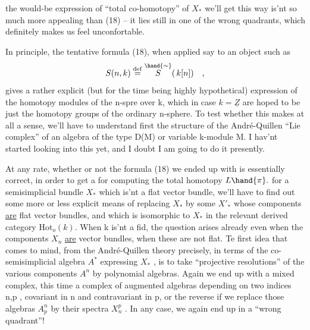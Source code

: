 
the would-be expression of ``total co-homotopy'' of $X_*$ we'll get this
way is'nt so much more appealing than (18) -- it lies still in one of
the wrong quadrants, which definitely makes us feel unconfortable.

In principle, the tentative formula (18), when applied say
to an object such as
\[ S(n,k)\overset{\mathrm{def}}{=} \overset{\hand{\sim}}{S}(\, k[n]) \quad , \]
gives a rather explicit (but for the time being highly hypothetical\hand{!})
expression of the homotopy modules of the n-spre over k, which in
case $k=\underline{Z}$ are hoped to be just the homotopy groups of the ordinary
n-sphere. To test whether this makes at all a sense, we'll have to
understand first the structure of the  André-Quillen ``Lie complex''
of an algebra  of the type D(M)\hand{,} or variable k-module M. I hav'nt started
looking into this yet, and I doubt I am going to do it presently.

At any rate, whether or not the formula (18) we ended up with
is essentially correct, in order  to get a   for computing
the total homotopy $L\hand{\pi}.$ for a semisimplicial bundle $X_*$ which is'nt a
flat vector bundle, we'll have to find out some more or less explicit
means of replacing $X_*$ by some $X'_*$  whose components \uline{are} flat vector
bundles, and which is isomorphic to $X_*$ in the relevant derived category
$\mathrm{Hot}_o(k)$. When k is'nt a fid, the question arises already even when 
 the components $X_n$ \uline{are} vector bundles, when these are not flat. Te
first idea that comes to mind, from the André-Quillen theory precisely,
 in terms of the co-semisimplicial algebra $A^*$ expressing $X_*$ ,
is to take ``projective resolutions'' of  the various components
$A^n$ by polynomial algebras. Again we end up with a mixed complex, this
time a complex of augmented algebras depending on two indices n,p ,
covariant in n and contravariant in p, or  the reverse if we
replace those algebras $A^n_p$ by their spectra $X_n^p$ . In any case,
we again end up in a ``wrong quadrant''! 

